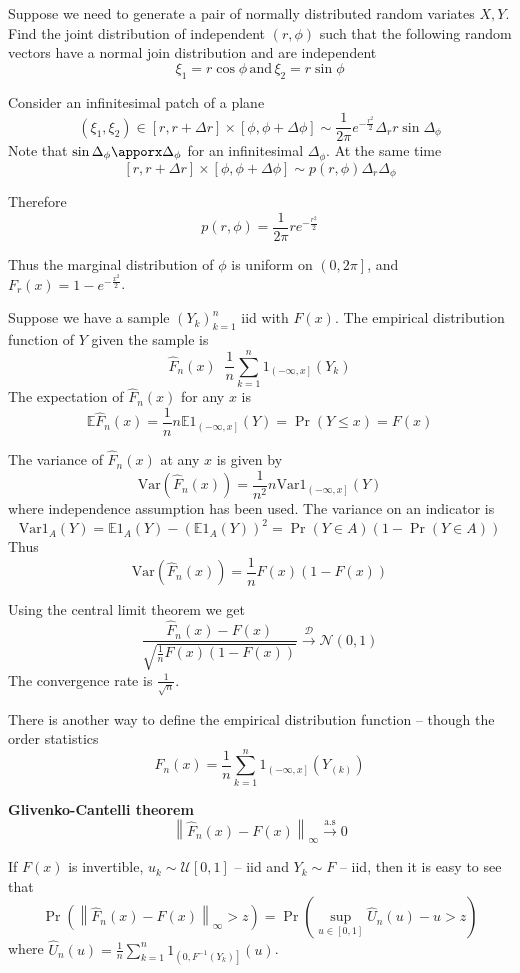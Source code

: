 \documentclass[a4paper]{article}
\newcommand{\clo}[1]{{\left [ #1 \right ]}}
\newcommand{\ploc}[1]{{\left ( #1 \right ]}}
\newcommand{\brac}[1]{{\left ( #1 \right )}}
\newcommand{\nrm}[1]{{\left\| #1 \right \|}}
\newcommand{\Ex}{\mathbb{E}}
\newcommand{\Var}{\text{Var}}
\newcommand{\defn}{\mathop{\overset{\Delta}{=}}\nolimits}
\begin{document}
Suppose we need to generate a pair of normally distributed random variates $X,Y$.
Find the joint distribution of independent $(r,\phi)$ such that the following random vectors have a normal join distribution and are independent
\[\xi_1 = r \cos\phi\,\text{and}\,\xi_2 = r \sin\phi\]

Consider an infinitesimal patch of a plane
\[(\xi_1, \xi_2)\in\clo{r,r+\Delta r}\times \clo{\phi,\phi+\Delta \phi}\sim
\frac{1}{2\pi} e^{-\frac{r^2}{2}} \Delta_r r\sin \Delta_\phi\]
Note that $\sin\Delta_\phi\apporx \Delta_\phi$ for an infinitesimal $\Delta_\phi$. At the same time
\[\clo{r,r+\Delta r}\times \clo{\phi,\phi+\Delta \phi} \sim p(r,\phi) \Delta_r\Delta_\phi\] 

Therefore
\[p(r,\phi) = \frac{1}{2\pi} r e^{-\frac{r^2}{2}}\]

Thus the marginal distribution of $\phi$ is uniform on $\ploc{0,2\pi}$, and $F_r(x) = 1 - e^{-\frac{x^2}{2}}$.


Suppose we have a sample $\brac{Y_k}_{k=1}^n$ iid with $F(x)$. The empirical distribution function of $Y$ given the sample is 
\[\hat{F}_n(x) \defn \frac{1}{n}\sum_{k=1}^n 1_\ploc{-\infty, x}(Y_k)\]
The expectation of $\hat{F}_n(x)$ for any $x$ is 
\[\Ex \hat{F}_n(x) = \frac{1}{n} n \Ex1_\ploc{-\infty, x}(Y) = \Pr\brac{Y\leq x} = F(x)\]

The variance of $\hat{F}_n(x)$ at any $x$ is given by
\[\Var\brac{\hat{F}_n(x)} = \frac{1}{n^2}n \Var{1_\ploc{-\infty, x}(Y)}\]
where independence assumption has been used.
The variance on an indicator is
\[\Var{1_A(Y)} = \Ex 1_A(Y) - \brac{\Ex 1_A(Y)}^2 = \Pr(Y\in A)\brac{1-\Pr(Y\in A)}\]
Thus \[\Var\brac{\hat{F}_n(x)} = \frac{1}{n} F(x)\brac{1-F(x)}\]

Using the central limit theorem we get
\[\frac{\hat{F}_n(x) - F(x)}{\sqrt{\frac{1}{n} F(x)\brac{1-F(x)}}}\overset{\mathcal{D}}{\to} \mathcal{N}(0,1)\]
The convergence rate is $\frac{1}{\sqrt{n}}$.

There is another way to define the empirical distribution function -- though the order statistics
\[\hat{F}_n(x) = \frac{1}{n}\sum_{k=1}^n 1_\ploc{-\infty,x}(Y_{(k)})\]

\noindent\textbf{Glivenko-Cantelli theorem}\hfill\\
\[\nrm{\hat{F}_n(x) - F(x)}_\infty \overset{\text{a.s}}{\to} 0\]

If $F(x)$ is invertible, $u_k\sim\mathcal{U}\clo{0,1}$ -- iid and $Y_k\sim F$ -- iid, then it is easy to see that 
\[\Pr\brac{\nrm{\hat{F}_n(x) - F(x)}_\infty>z} = \Pr\brac{\sup_{u\in\clo{0,1}}{\hat{U}_n(u) - u}>z}\]
where $\hat{U}_n(u) = \frac{1}{n}\sum_{k=1}^n 1_\ploc{0,F^{-1}(Y_k)}(u)$.
\end{document}
